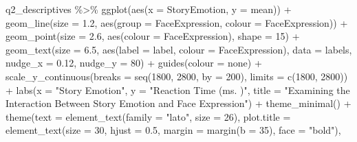 \documentclass[
]{article}
\newenvironment{Shaded}{\begin{snugshade}}{\end{snugshade}}
\newcommand{\AttributeTok}[1]{\textcolor[rgb]{0.77,0.63,0.00}{#1}}
\newcommand{\DecValTok}[1]{\textcolor[rgb]{0.00,0.00,0.81}{#1}}
\newcommand{\FloatTok}[1]{\textcolor[rgb]{0.00,0.00,0.81}{#1}}
\newcommand{\FunctionTok}[1]{\textcolor[rgb]{0.00,0.00,0.00}{#1}}
\newcommand{\NormalTok}[1]{#1}
\newcommand{\SpecialCharTok}[1]{\textcolor[rgb]{0.00,0.00,0.00}{#1}}
\newcommand{\StringTok}[1]{\textcolor[rgb]{0.31,0.60,0.02}{#1}}
\begin{document}
\begin{Shaded}
\begin{Highlighting}[]
\NormalTok{q2\_descriptives }\SpecialCharTok{\%\textgreater{}\%} 
  \FunctionTok{ggplot}\NormalTok{(}\FunctionTok{aes}\NormalTok{(}\AttributeTok{x =}\NormalTok{ StoryEmotion, }\AttributeTok{y =}\NormalTok{ mean)) }\SpecialCharTok{+}
  \FunctionTok{geom\_line}\NormalTok{(}\AttributeTok{size =} \FloatTok{1.2}\NormalTok{, }\FunctionTok{aes}\NormalTok{(}\AttributeTok{group =}\NormalTok{ FaceExpression, }\AttributeTok{colour =}\NormalTok{ FaceExpression)) }\SpecialCharTok{+}
  \FunctionTok{geom\_point}\NormalTok{(}\AttributeTok{size =} \FloatTok{2.6}\NormalTok{, }\FunctionTok{aes}\NormalTok{(}\AttributeTok{colour =}\NormalTok{ FaceExpression), }\AttributeTok{shape =} \DecValTok{15}\NormalTok{) }\SpecialCharTok{+}
  \FunctionTok{geom\_text}\NormalTok{(}\AttributeTok{size =} \FloatTok{6.5}\NormalTok{, }\FunctionTok{aes}\NormalTok{(}\AttributeTok{label =}\NormalTok{ label,}
                          \AttributeTok{colour =}\NormalTok{ FaceExpression),}
            \AttributeTok{data =}\NormalTok{ labels,}
            \AttributeTok{nudge\_x =} \FloatTok{0.12}\NormalTok{,}
            \AttributeTok{nudge\_y =} \DecValTok{80}\NormalTok{) }\SpecialCharTok{+}
  \FunctionTok{guides}\NormalTok{(}\AttributeTok{colour =} \StringTok{\textquotesingle{}none\textquotesingle{}}\NormalTok{) }\SpecialCharTok{+}
  \FunctionTok{scale\_y\_continuous}\NormalTok{(}\AttributeTok{breaks =} \FunctionTok{seq}\NormalTok{(}\DecValTok{1800}\NormalTok{, }\DecValTok{2800}\NormalTok{, }\AttributeTok{by =} \DecValTok{200}\NormalTok{),}
                     \AttributeTok{limits =} \FunctionTok{c}\NormalTok{(}\DecValTok{1800}\NormalTok{, }\DecValTok{2800}\NormalTok{)) }\SpecialCharTok{+}
  \FunctionTok{labs}\NormalTok{(}\AttributeTok{x =} \StringTok{"Story Emotion"}\NormalTok{,}
       \AttributeTok{y =} \StringTok{"Reaction Time (ms. )"}\NormalTok{,}
       \AttributeTok{title =} \StringTok{"Examining the Interaction Between }
\StringTok{       Story Emotion and Face Expression"}\NormalTok{) }\SpecialCharTok{+}
  \FunctionTok{theme\_minimal}\NormalTok{() }\SpecialCharTok{+}
  \FunctionTok{theme}\NormalTok{(}\AttributeTok{text =} \FunctionTok{element\_text}\NormalTok{(}\AttributeTok{family =} \StringTok{"lato"}\NormalTok{, }\AttributeTok{size =} \DecValTok{26}\NormalTok{),}
        \AttributeTok{plot.title =} \FunctionTok{element\_text}\NormalTok{(}\AttributeTok{size =} \DecValTok{30}\NormalTok{, }\AttributeTok{hjust =} \FloatTok{0.5}\NormalTok{, }\AttributeTok{margin =} \FunctionTok{margin}\NormalTok{(}\AttributeTok{b =} \DecValTok{35}\NormalTok{), }\AttributeTok{face =} \StringTok{"bold"}\NormalTok{),}

\end{Highlighting}
\end{Shaded}
\end{document}
